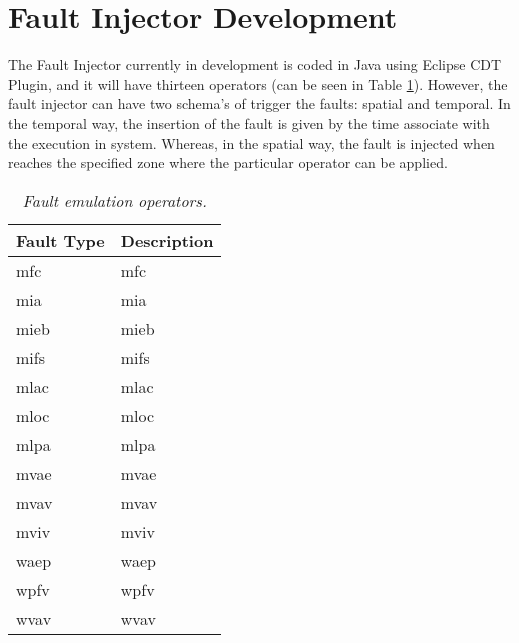 \newpage
\section{Fault Injector Development}

The Fault Injector currently in development is coded in Java using Eclipse CDT Plugin, and it will have thirteen operators (can be seen in Table \ref{tab:faultEmulationOperators})\cite{duraes2005thesis}. However, the fault injector can have two schema's of trigger the faults: spatial and temporal. In the temporal way, the insertion of the fault is given by the time associate with the execution in system. Whereas, in the spatial way, the fault is injected when reaches the specified zone where the particular operator can be applied.

\begin{table}[!ht]
\begin{tabular}{|l|p{12cm}|}
\hline
\textbf{Fault Type}		& \multicolumn{1}{c|}{\textbf{Description}}		\\ \hline \hline
\acs{mfc}        				& \Acl{mfc}  									\\ \hline
\acs{mia}        				& \Acl{mia}  									\\ \hline
\acs{mieb}       				& \Acl{mieb} 									\\ \hline
\acs{mifs}       				& \Acl{mifs} 									\\ \hline
\acs{mlac}       				& \Acl{mlac} 									\\ \hline
\acs{mloc}       				& \Acl{mloc} 									\\ \hline
\acs{mlpa}       				& \Acl{mlpa} 									\\ \hline
\acs{mvae}       				& \Acl{mvae} 									\\ \hline
\acs{mvav}       				& \Acl{mvav} 									\\ \hline
\acs{mviv}       				& \Acl{mviv} 									\\ \hline
\acs{waep}       				& \Acl{waep} 									\\ \hline
\acs{wpfv}       				& \Acl{wpfv} 									\\ \hline
\acs{wvav}       				& \Acl{wvav} 									\\ \hline
\end{tabular}
\caption{\small \sl Fault emulation operators.\label{tab:faultEmulationOperators}}
\end{table}


